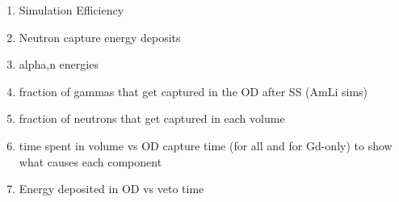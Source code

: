 \begin{tcolorbox}[colback=red!5!white, colframe=red!50!black, title=Key Plots]
\begin{enumerate}
    \item Simulation Efficiency
    \item Neutron capture energy deposits
    \item alpha,n energies
    \item fraction of gammas that get captured in the OD after SS (AmLi sims)
    \item fraction of neutrons that get captured in each volume
    \item time spent in volume vs OD capture time (for all and for Gd-only) to show what causes each component
    \item Energy deposited in OD vs veto time
\end{enumerate}
\end{tcolorbox}



